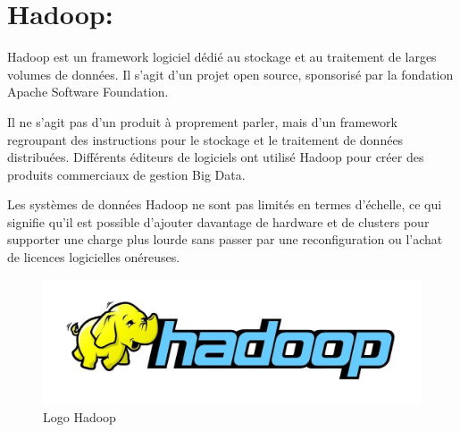 \section{Hadoop:}

Hadoop est un framework logiciel dédié au stockage et au traitement de larges volumes de données. Il s’agit d’un projet open source, sponsorisé par la fondation Apache Software Foundation.

Il ne s’agit pas d’un produit à proprement parler, mais d’un framework regroupant des instructions pour le stockage et le traitement de données distribuées. Différents éditeurs de logiciels ont utilisé Hadoop pour créer des produits commerciaux de gestion Big Data.

Les systèmes de données Hadoop ne sont pas limités en termes d’échelle, ce qui signifie qu’il est possible d’ajouter davantage de hardware et de clusters pour supporter une charge plus lourde sans passer par une reconfiguration ou l’achat de licences logicielles onéreuses.

\begin{figure}[h]
	\centering
    \includegraphics[scale=0.3]{img/part3/1.2}
    \caption{Logo Hadoop}
\end{figure}

